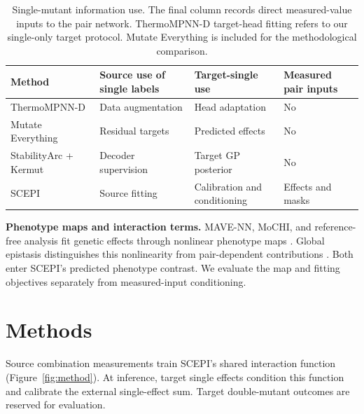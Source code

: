 \documentclass{llncs}
\begin{document}
\begin{table}[!b]
\centering
\setlength{\tabcolsep}{4pt}
\caption{Single-mutant information use. The final column records direct measured-value inputs to the pair network. ThermoMPNN-D target-head fitting refers to our single-only target protocol. Mutate Everything is included for the methodological comparison.}
\label{tab:information}
\begin{tabular}{@{}>{\raggedright\arraybackslash}p{}>{\raggedright\arraybackslash}p{}>{\raggedright\arraybackslash}p{}>{\raggedright\arraybackslash}p{}@{}}
\toprule
Method & Source use of single labels & Target-single use & Measured pair inputs \\
\midrule
ThermoMPNN-D \citep{dieckhaus2025} & Data augmentation & Head adaptation & No \\
Mutate Everything \citep{ouyang2023} & Residual targets & Predicted effects & No \\
StabilityArc + Kermut \citep{feller2026,groth2024} & Decoder supervision & Target GP posterior & No \\
SCEPI & Source fitting & Calibration and conditioning & Effects and masks \\
\bottomrule
\end{tabular}
\end{table}

\noindent\textbf{Phenotype maps and interaction terms.} MAVE-NN, MoCHI, and reference-free analysis fit genetic effects through nonlinear phenotype maps \citep{tareen2022,faure2024,park2024}. Global epistasis distinguishes this nonlinearity from pair-dependent contributions \citep{otwinowski2018}. Both enter SCEPI's predicted phenotype contrast. We evaluate the map and fitting objectives separately from measured-input conditioning.

\section{Methods}

Source combination measurements train SCEPI's shared interaction function (Figure~\ref{fig:method}). At inference, target single effects condition this function and calibrate the external single-effect sum. Target double-mutant outcomes are reserved for evaluation.
\end{document}
